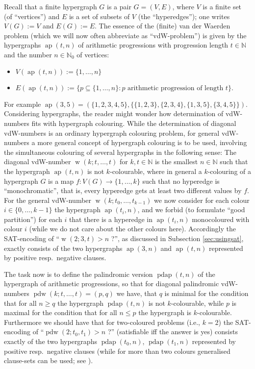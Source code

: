 \documentclass[final,3p,times]{elsarticle}
\theoremstyle{definition}
\newcommand{\set}[1]{\{#1\}}
\renewcommand{\leq}{\le} %
\newcommand{\NN}{\mathbb{N}}
\newcommand{\NNZ}{\NN_0}
\DeclareMathOperator{\vdw}{w}
\DeclareMathOperator{\vdwpd}{pdw}
\DeclareMathOperator{\arithp}{ap}
\DeclareMathOperator{\pdarithp}{pdap}
\begin{document}
Recall that a finite hypergraph $G$ is a pair $G = (V,E)$, where $V$ is a finite set (of ``vertices'') and $E$ is a set of subsets of $V$ (the ``hyperedges''); one writes $V(G) := V$ and $E(G) := E$. The essence of the (finite) van der Waerden problem (which we will now often abbreviate as ``vdW-problem'') is given by the hypergraphs $\arithp(t,n)$ of arithmetic progressions with progression length $t \in \NN$ and the number $n \in \NNZ$ of vertices:
\begin{itemize}
\item $V(\arithp(t,n)) := \set{1,\dots,n}$
\item $E(\arithp(t,n)) := \set{p \subseteq \set{1,\dots,n} : p \text{ arithmetic progression of length } t}$.
\end{itemize}
For example $\arithp(3,5) = (\set{1,2,3,4,5},\set{\set{1,2,3},\set{2,3,4},\set{1,3,5},\set{3,4,5}})$. Considering hypergraphs, the reader might wonder how determination of vdW-numbers fits with hypergraph colouring. While the determination of diagonal vdW-numbers is an ordinary hypergraph colouring problem, for general vdW-numbers a more general concept of hypergraph colouring is to be used, involving the simultaneous colouring of several hypergraphs in the following sense: The diagonal vdW-number $\vdw(k; t, \dots, t)$ for $k, t \in \NN$ is the smallest $n \in \NN$ such that the hypergraph $\arithp(t,n)$ is not $k$-colourable, where in general a $k$-colouring of a hypergraph $G$ is a map $f: V(G) \rightarrow \set{1,\dots,k}$ such that no hyperedge is ``monochromatic'', that is, every hyperedge gets at least two different values by $f$. For the general vdW-number $\vdw(k; t_0, \dots, t_{k-1})$ we now consider for each colour $i \in \set{0,\dots,k-1}$ the hypergraph $\arithp(t_i,n)$, and we forbid (to formulate ``good partition'') for each $i$ that there is a hyperedge in $\arithp(t_i,n)$ monocoloured with colour $i$ (while we do not care about the other colours here). Accordingly the SAT-encoding of ``$\vdw(2;3,t) > n$ ?'', as discussed in Subsection \ref{sec:usingsat}, exactly consists of the two hypergraphs $\arithp(3,n)$ and $\arithp(t,n)$ represented by positive resp.\ negative clauses.

The task now is to define the palindromic version $\pdarithp(t,n)$ of the hypergraph of arithmetic progressions, so that for diagonal palindromic vdW-numbers $\vdwpd(k; t, \dots, t) = (p,q)$ we have, that $q$ is minimal for the condition that for all $n \geq q$ the hypergraph $\pdarithp(t,n)$ is not $k$-colourable, while $p$ is maximal for the condition that for all $n \leq p$ the hypergraph is $k$-colourable. Furthermore we should have that for two-coloured problems (i.e., $k=2$) the SAT-encoding of ``$\vdwpd(2;t_0,t_1) > n$ ?'' (satisfiable iff the answer is yes) consists exactly of the two hypergraphs $\pdarithp(t_0,n)$, $\pdarithp(t_1,n)$ represented by positive resp.\ negative clauses (while for more than two colours generalised clause-sets can be used; see \cite{kullmann}).
\end{document}
